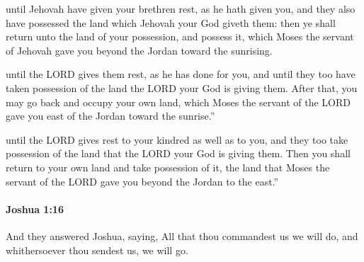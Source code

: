 			\begin{versebox}
					\item[BHS] 
					\item[ASV] until Jehovah have given your brethren rest, as he hath given you, and they also have possessed the land which Jehovah your God giveth them: then ye shall return unto the land of your possession, and possess it, which Moses the servant of Jehovah gave you beyond the Jordan toward the sunrising.
					\item[NIV] until the LORD gives them rest, as he has done for you, and until they too have taken possession of the land the LORD your God is giving them. After that, you may go back and occupy your own land, which Moses the servant of the LORD gave you east of the Jordan toward the sunrise.”
					\item[NRSV] until the LORD gives rest to your kindred as well as to you, and they too take possession of the land that the LORD your God is giving them. Then you shall return to your own land and take possession of it, the land that Moses the servant of the LORD gave you beyond the Jordan to the east.”
			\end{versebox}

		\paragraph{Joshua 1:16} %
			\label{JOSHUA-1-16}

			And they answered Joshua, saying, All that thou commandest us we will do, and whithersoever thou sendest us, we will go.

